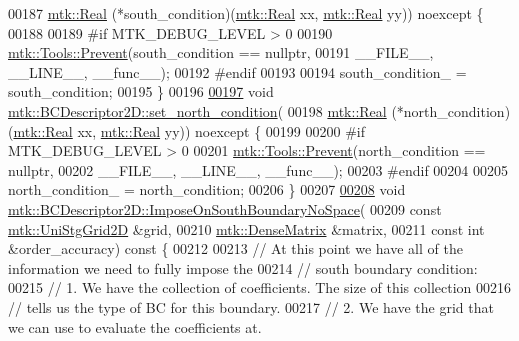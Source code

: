 \begin{DoxyCode}
00187     \hyperlink{group__c01-roots_gac080bbbf5cbb5502c9f00405f894857d}{mtk::Real} (*south\_condition)(\hyperlink{group__c01-roots_gac080bbbf5cbb5502c9f00405f894857d}{mtk::Real} xx, \hyperlink{group__c01-roots_gac080bbbf5cbb5502c9f00405f894857d}{mtk::Real} yy)) noexcept \{
00188 
00189 \textcolor{preprocessor}{  #if MTK\_DEBUG\_LEVEL > 0}
00190   \hyperlink{classmtk_1_1Tools_a332324c6f25e66be9dff48c5987a3b9f}{mtk::Tools::Prevent}(south\_condition == \textcolor{keyword}{nullptr},
00191                       \_\_FILE\_\_, \_\_LINE\_\_, \_\_func\_\_);
00192 \textcolor{preprocessor}{  #endif}
00193 
00194   south\_condition\_ = south\_condition;
00195 \}
00196 
\hypertarget{mtk__bc__descriptor__2d_8cc_source_l00197}{}\hyperlink{classmtk_1_1BCDescriptor2D_a690f6881a88b202c074d9f90f2a7ddb0}{00197} \textcolor{keywordtype}{void} \hyperlink{classmtk_1_1BCDescriptor2D_a690f6881a88b202c074d9f90f2a7ddb0}{mtk::BCDescriptor2D::set\_north\_condition}(
00198     \hyperlink{group__c01-roots_gac080bbbf5cbb5502c9f00405f894857d}{mtk::Real} (*north\_condition)(\hyperlink{group__c01-roots_gac080bbbf5cbb5502c9f00405f894857d}{mtk::Real} xx, \hyperlink{group__c01-roots_gac080bbbf5cbb5502c9f00405f894857d}{mtk::Real} yy)) noexcept \{
00199 
00200 \textcolor{preprocessor}{  #if MTK\_DEBUG\_LEVEL > 0}
00201   \hyperlink{classmtk_1_1Tools_a332324c6f25e66be9dff48c5987a3b9f}{mtk::Tools::Prevent}(north\_condition == \textcolor{keyword}{nullptr},
00202                       \_\_FILE\_\_, \_\_LINE\_\_, \_\_func\_\_);
00203 \textcolor{preprocessor}{  #endif}
00204 
00205   north\_condition\_ = north\_condition;
00206 \}
00207 
\hypertarget{mtk__bc__descriptor__2d_8cc_source_l00208}{}\hyperlink{classmtk_1_1BCDescriptor2D_a0188a64f242ae6015385a4597934fcda}{00208} \textcolor{keywordtype}{void} \hyperlink{classmtk_1_1BCDescriptor2D_a0188a64f242ae6015385a4597934fcda}{mtk::BCDescriptor2D::ImposeOnSouthBoundaryNoSpace}(
00209     \textcolor{keyword}{const} \hyperlink{classmtk_1_1UniStgGrid2D}{mtk::UniStgGrid2D} &grid,
00210     \hyperlink{classmtk_1_1DenseMatrix}{mtk::DenseMatrix} &matrix,
00211     \textcolor{keyword}{const} \textcolor{keywordtype}{int} &order\_accuracy)\textcolor{keyword}{ const }\{
00212 
00213   \textcolor{comment}{// At this point we have all of the information we need to fully impose the}
00214   \textcolor{comment}{// south boundary condition:}
00215   \textcolor{comment}{// 1. We have the collection of coefficients. The size of this collection}
00216   \textcolor{comment}{// tells us the type of BC for this boundary.}
00217   \textcolor{comment}{// 2. We have the grid that we can use to evaluate the coefficients at.}

\end{DoxyCode}
